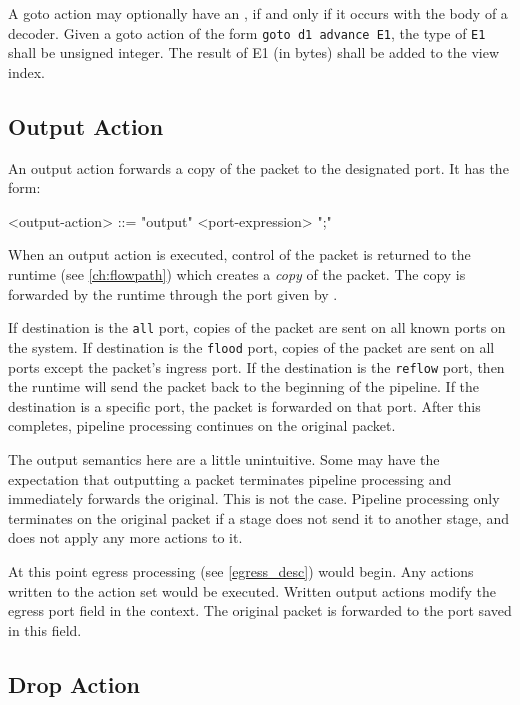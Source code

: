 A goto action may optionally have an , if and only if it occurs with the body of a decoder. Given a goto action of the form \texttt{goto d1 advance E1}, the type of \texttt{E1} shall be unsigned integer. The result of E1 (in bytes) shall be added to the view index.

\subsection{Output Action} \label{guide:output}

An output action forwards a copy of the packet to the designated port. It has the form:

\begin{minip}
\begin{grammar}
<output-action> ::= "output" <port-expression> ";"
\end{grammar}
\end{minip}

When an output action is executed, control of the packet is returned to the runtime (see \ref{ch:flowpath}) which creates a \textit{copy} of the packet. The copy is forwarded by the runtime through the port given by .

If destination is the \texttt{all} port, copies of the packet are sent on all known ports on the system. If destination is the \texttt{flood} port, copies of the packet are sent on all ports except the packet's ingress port. If the destination is the \texttt{reflow} port, then the runtime will send the packet back to the beginning of the pipeline. If the destination is a specific port, the packet is forwarded on that port. After this completes, pipeline processing continues on the original packet.

The output semantics here are a little unintuitive. Some may have the expectation that outputting a packet terminates pipeline processing and immediately forwards the original. This is not the case. Pipeline processing only terminates on the original packet if a stage does not send it to another stage, and does not apply any more actions to it. 

At this point egress processing (see \ref{egress_desc}) would begin. Any actions written to the action set would be executed. Written output actions modify the egress port field in the context. The original packet is forwarded to the port saved in this field.

\subsection{Drop Action} \label{guide:drop}

